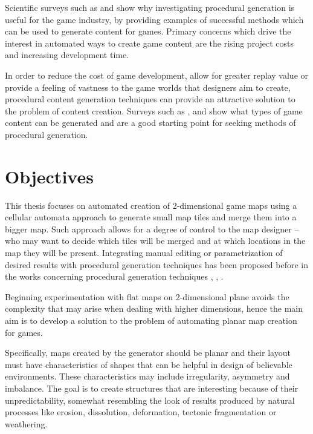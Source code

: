\documentclass[12pt]{report}
\begin{document}
Scientific surveys such as \autocite{hendrikx2013procedural} and \autocite{smelik2009survey} show why investigating procedural generation is useful for the game industry, by providing examples of successful methods which can be used to generate content for games. Primary concerns which drive the interest in automated ways to create game content are the rising project costs and increasing development time.

In order to reduce the cost of game development, allow for greater replay value or provide a feeling of vastness to the game worlds that designers aim to create, procedural content generation techniques can provide an attractive solution to the problem of content creation. Surveys such as \autocite{hendrikx2013procedural}, \autocite{togelius2011search} and \autocite{de2011survey} show what types of game content can be generated and are a good starting point for seeking methods of procedural generation.
 
\section{Objectives}

This thesis focuses on automated creation of 2-dimensional game maps using a cellular automata approach to generate small map tiles and merge them into a bigger map. Such approach allows for a degree of control to the map designer -- who may want to decide which tiles will be merged and at which locations in the map they will be present. Integrating manual editing or parametrization of desired results with procedural generation techniques has been proposed before in the works concerning procedural generation techniques \autocite{bidarra2010integrating}, \autocite{smelik2010integrating}, \autocite{smelik2011declarative}. 

Beginning experimentation with flat maps on 2-dimensional plane avoids the complexity that may arise when dealing with higher dimensions, hence the main aim is to develop a solution to the problem of automating planar map creation for games. 

Specifically, maps created by the generator should be planar and their layout must have characteristics of shapes that can be helpful in design of believable environments. These characteristics may include irregularity, asymmetry and imbalance. The goal is to create structures that are interesting because of their unpredictability, somewhat resembling the look of results produced by natural processes like erosion, dissolution, deformation, tectonic fragmentation or weathering.
 
\end{document}
